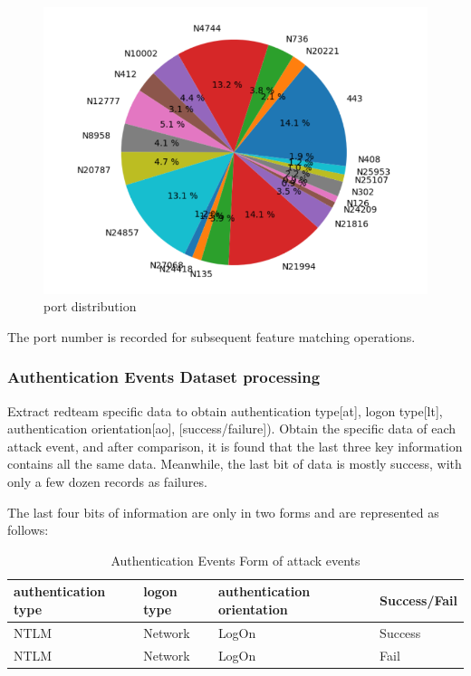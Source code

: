 \documentclass[12pt,journal,draftcls,doublespace, letterpaper,onecolumn]{IEEEtran}
\begin{document}
\begin{figure}[htpb]
	\centering
	\includegraphics [width=1\textwidth]{10.png}
	\caption{port distribution}
	\label{fig}
\end{figure}

The port number is recorded for subsequent feature matching operations.


\subsubsection{Authentication Events Dataset processing}
Extract redteam specific data to obtain authentication type[at], logon type[lt], authentication orientation[ao], [success/failure]). Obtain the specific data of each attack event, and after comparison, it is found that the last three key information contains all the same data. Meanwhile, the last bit of data is mostly success, with only a few dozen records as failures.

The last four bits of information are only in two forms and are represented as follows:

\begin{table}[h]
	\caption{Authentication Events Form of attack events}
	\vspace{1pt}
	\centering
	\begin{tabular}{p{3cm}p{3cm}p{4cm}p{3cm}}
		\hline
		authentication type & logon type & authentication orientation & Success/Fail \\
		\hline
		NTLM & Network & LogOn & Success\\
		NTLM & Network & LogOn & Fail\\
		\hline       
	\end{tabular}
	\label{bs2}
\end{table}
\end{document}
